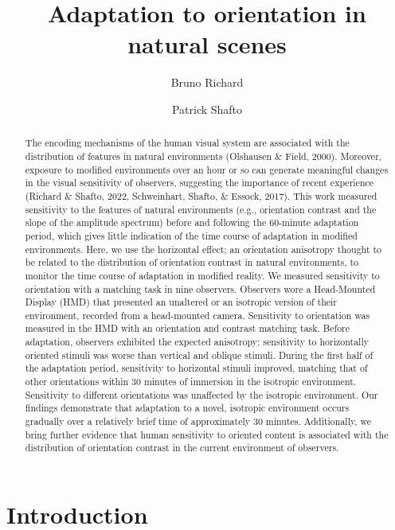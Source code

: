 \documentclass[
  12pt,
  letterpaper,
  DIV=11,
  numbers=noendperiod]{scrartcl}
\title{Adaptation to orientation in natural scenes}
\author{Bruno Richard \and Patrick Shafto}
\date{}
\begin{document}
\maketitle
\begin{abstract}
The encoding mechanisms of the human visual system are associated with
the distribution of features in natural environments (Olshausen \&
Field, 2000). Moreover, exposure to modified environments over an hour
or so can generate meaningful changes in the visual sensitivity of
observers, suggesting the importance of recent experience (Richard \&
Shafto, 2022, Schweinhart, Shafto, \& Essock, 2017). This work measured
sensitivity to the features of natural environments (e.g., orientation
contrast and the slope of the amplitude spectrum) before and following
the 60-minute adaptation period, which gives little indication of the
time course of adaptation in modified environments. Here, we use the
horizontal effect; an orientation anisotropy thought to be related to
the distribution of orientation contrast in natural environments, to
monitor the time course of adaptation in modified reality. We measured
sensitivity to orientation with a matching task in nine observers.
Observers wore a Head-Mounted Display (HMD) that presented an unaltered
or an isotropic version of their environment, recorded from a
head-mounted camera. Sensitivity to orientation was measured in the HMD
with an orientation and contrast matching task. Before adaptation,
observers exhibited the expected anisotropy; sensitivity to horizontally
oriented stimuli was worse than vertical and oblique stimuli. During the
first half of the adaptation period, sensitivity to horizontal stimuli
improved, matching that of other orientations within 30 minutes of
immersion in the isotropic environment. Sensitivity to different
orientations was unaffected by the isotropic environment. Our findings
demonstrate that adaptation to a novel, isotropic environment occurs
gradually over a relatively brief time of approximately 30 minutes.
Additionally, we bring further evidence that human sensitivity to
oriented content is associated with the distribution of orientation
contrast in the current environment of observers.
\end{abstract}


\section{Introduction}\label{introduction}
\end{document}

